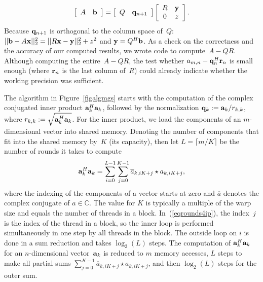 \documentclass{article}
\newcommand\x{{\bf x}}
\newcommand\y{{\bf y}}
\newcommand\bfa{{\bf a}}
\newcommand\bfb{{\bf b}}
\newcommand\bfq{{\bf q}}
\newcommand\cc{{\mathbb C}}
\begin{document}
\begin{equation}
   \left[ 
      \begin{array}{cc}
         A & \bfb
      \end{array}
   \right]
   = 
   \left[
      \begin{array}{cc}
         Q & \bfq_{n+1}
      \end{array}
   \right]
   \left[
      \begin{array}{cc}
         R & \y \\
         0 & z
      \end{array}
   \right].
\end{equation}
Because $\bfq_{n+1}$ is orthogonal to the column space of~$Q$:
$|| \bfb - A \x ||_2^2 = ||R \x - \y||_2^2 + z^2$ and $\y = Q^H \bfb$.
As a check on the correctness and the accuracy of our computed results, 
we wrote code to compute~$A - QR$.
Although computing the entire~$A - QR$, the test whether 
$a_{m,n} - \bfq_n^H {\bf r}_n$ is small enough 
(where ${\bf r}_n$ is the last column of~$R$)
could already indicate whether the working precision was sufficient.

The algorithm in Figure~\ref{figalgmgs} starts with 
the computation of the complex conjugated inner product
$\bfa_k^H \bfa_k$, followed by the normalization
$\bfq_k := \bfa_k/r_{k, k}$, where $r_{k, k} := \sqrt{ \bfa_k^H \bfa_k }$.
For the inner product, we load the components of an $m$-dimensional vector
into shared memory.  Denoting the number of components that fit into the
shared memory by~$K$ (its capacity), then let $L = \lceil m/K \rceil$
be the number of rounds it takes to compute
\begin{equation} \label{eqrounds4ip}
   \bfa_k^H \bfa_k = \sum_{i=0}^{L-1} \sum_{j=0}^{K-1}
   \overline{a}_{k, i K + j} \star a_{k, i K + j},
\end{equation}
where the indexing of the components of a vector starts at zero
and $\overline{a}$ denotes the complex conjugate of $a \in \cc$.
The value for $K$ is typically a multiple of the warp size
and equals the number of threads in a block.
In~(\ref{eqrounds4ip}), the index~$j$ is the index of the thread
in a block, so the inner loop is performed simultaneously in one step
by all threads in the block.  The outside loop on $i$ is done in
a sum reduction and takes $\log_2(L)$ steps.
The computation of $\bfa_k^H \bfa_k$ for an $n$-dimensional vector~$\bfa_k$
is reduced to $m$ memory accesses, $L$ steps to make all partial sums
$\displaystyle \sum_{j=0}^{K-1} 
 \overline{a}_{k, i K + j} \star a_{k, i K + j}$,
and then $\log_2(L)$ steps for the outer sum.
\end{document}
